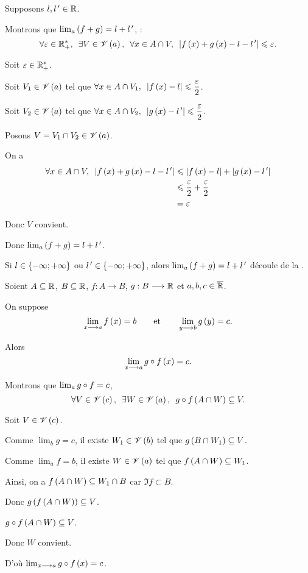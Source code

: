 \begin{dem}[Somme]
Supposons \(l,l^{\,\prime}\in\mathbb{R}\).

Montrons que \(\lim_a\left(f+g\right)=l+l^{\,\prime}\), \cad : \[\quantifs{\forall\epsilon\in\Rps;\exists V\in\V{a};\forall x\in A\inter V}\abs{f\paren{x}+g\paren{x}-l-l\prim}\leq\epsilon.\]

Soit \(\varepsilon\in\mathbb{R}_+^*\).

Soit \(V_1\in\mathscr{V}\left(a\right)\) tel que \(\quantifs{\forall x\in A\inter V_1}\abs{f\paren{x}-l}\leq\dfrac{\epsilon}{2}\).

Soit \(V_2\in\mathscr{V}\left(a\right)\) tel que \(\quantifs{\forall x\in A\inter V_2}\abs{g\paren{x}-l\prim}\leq\dfrac{\epsilon}{2}\).

Posons \(V=V_1\cap V_2\in\mathscr{V}\left(a\right)\).

On a \[\begin{aligned}
\quantifs{\forall x\in A\inter V}\abs{f\paren{x}+g\paren{x}-l-l\prim}&\leq\abs{f\paren{x}-l}+\abs{g\paren{x}-l\prim} \\
&\leq\dfrac{\epsilon}{2}+\dfrac{\epsilon}{2} \\
&=\epsilon
\end{aligned}\]

Donc \(V\) convient.

Donc \(\lim_a\left(f+g\right)=l+l^{\,\prime}\).

Si \(l\in\left\lbrace-\infty;+\infty\right\rbrace\) ou \(l^{\,\prime}\in\left\lbrace-\infty;+\infty\right\rbrace\), alors \(\lim_a\left(f+g\right)=l+l^{\,\prime}\) découle de la .
\end{dem}

\begin{dem}
\end{dem}

\begin{prop}
Soient \(A\subseteq\mathbb{R}\), \(B\subseteq\mathbb{R}\), \(f:A\to B\), \(g:B\longrightarrow\mathbb{R}\) et \(a,b,c\in\overline{\mathbb{R}}\).

On suppose \[\lim_{x\longrightarrow a}f\left(x\right)=b\qquad\text{et}\qquad\lim_{y\longrightarrow b}g\left(y\right)=c.\]

Alors \[\lim_{x\longrightarrow a}g\circ f\left(x\right)=c.\]
\end{prop}

\begin{dem}
Montrons que \(\lim_ag\circ f=c\), \cad \[\quantifs{\forall V\in\V{c};\exists W\in\V{a}}g\rond f\paren{A\inter W}\subset V.\]

Soit \(V\in\mathscr{V}\left(c\right)\).

Comme \(\lim_bg=c\), il existe \(W_1\in\mathscr{V}\left(b\right)\) tel que \(g\left(B\cap W_1\right)\subseteq V\).

Comme \(\lim_af=b\), il existe \(W\in\mathscr{V}\left(a\right)\) tel que \(f\left(A\cap W\right)\subseteq W_1\).

Ainsi, on a \(f\left(A\cap W\right)\subseteq W_1\cap B\) car \(\Im f\subset B\).

Donc \(g\left(f\left(A\cap W\right)\right)\subseteq V\).

\Cad \(g\circ f\left(A\cap W\right)\subseteq V\).

Donc \(W\) convient.

D'où \(\lim_{x\longrightarrow a}g\circ f\left(x\right)=c\).
\end{dem}

